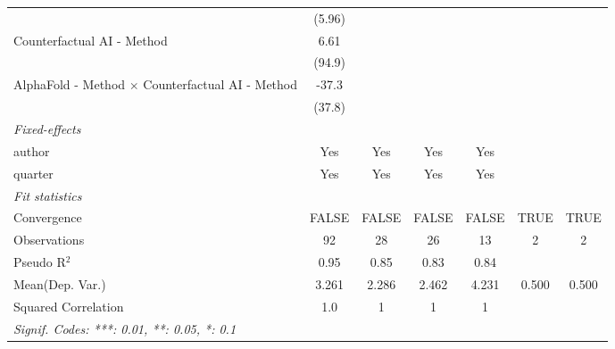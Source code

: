 \begin{tabular}{lcccccc}
                                                           & (5.96)       &               &         &              &      &   \\   
   Counterfactual AI - Method                              & 6.61         &               &         &              &      &   \\   
                                                           & (94.9)       &               &         &              &      &   \\   
   AlphaFold - Method $\times$ Counterfactual AI - Method  & -37.3        &               &         &              &      &   \\   
                                                           & (37.8)       &               &         &              &      &   \\   
   \midrule
   \emph{Fixed-effects}\\
   author                                                  & Yes          & Yes           & Yes     & Yes          &      & \\  
   quarter                                                 & Yes          & Yes           & Yes     & Yes          &      & \\  
   \midrule
   \emph{Fit statistics}\\
   Convergence                                             &FALSE         & FALSE         & FALSE   & FALSE        & TRUE & TRUE\\  
   Observations                                            & 92           & 28            & 26      & 13           & 2    & 2\\  
   Pseudo R$^2$                                            & 0.95         & 0.85          & 0.83    & 0.84         &      & \\  
Mean(Dep. Var.) & 3.261 & 2.286 & 2.462 & 4.231 & 0.500 & 0.500 \\
   Squared Correlation                                     & 1.0          & 1             & 1       & 1            &      & \\  
   \midrule \midrule
   \multicolumn{7}{l}{\emph{Signif. Codes: ***: 0.01, **: 0.05, *: 0.1}}\\
\end{tabular}
\par\endgroup
